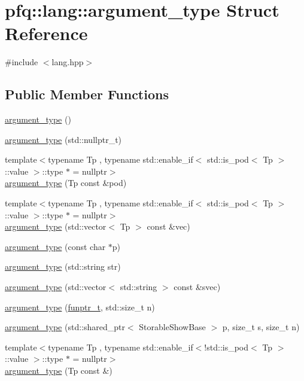 \hypertarget{structpfq_1_1lang_1_1argument__type}{\section{pfq\+:\+:lang\+:\+:argument\+\_\+type Struct Reference}
\label{structpfq_1_1lang_1_1argument__type}
}


{\ttfamily \#include $<$lang.\+hpp$>$}

\subsection*{Public Member Functions}
\begin{DoxyCompactItemize}
\item 
\hyperlink{structpfq_1_1lang_1_1argument__type_aa89bbfb7ed7487d09512e29bc8df723a}{argument\+\_\+type} ()
\item 
\hyperlink{structpfq_1_1lang_1_1argument__type_aaa36abcce4c5e2418fc5a10328619a2d}{argument\+\_\+type} (std\+::nullptr\+\_\+t)
\item 
{\footnotesize template$<$typename Tp , typename std\+::enable\+\_\+if$<$ std\+::is\+\_\+pod$<$ Tp $>$\+::value $>$\+::type $\ast$  = nullptr$>$ }\\\hyperlink{structpfq_1_1lang_1_1argument__type_a1ed803face97c18de5b24a852174f160}{argument\+\_\+type} (Tp const \&pod)
\item 
{\footnotesize template$<$typename Tp , typename std\+::enable\+\_\+if$<$ std\+::is\+\_\+pod$<$ Tp $>$\+::value $>$\+::type $\ast$  = nullptr$>$ }\\\hyperlink{structpfq_1_1lang_1_1argument__type_a214fc2f5dc718677454cde46788cef1d}{argument\+\_\+type} (std\+::vector$<$ Tp $>$ const \&vec)
\item 
\hyperlink{structpfq_1_1lang_1_1argument__type_a775f6b6bf458de21aef78e3b806ead9d}{argument\+\_\+type} (const char $\ast$p)
\item 
\hyperlink{structpfq_1_1lang_1_1argument__type_a568ea3646078a7ab97132cbff3805980}{argument\+\_\+type} (std\+::string str)
\item 
\hyperlink{structpfq_1_1lang_1_1argument__type_a0c92af37601c940e4a0359489a6e752e}{argument\+\_\+type} (std\+::vector$<$ std\+::string $>$ const \&svec)
\item 
\hyperlink{structpfq_1_1lang_1_1argument__type_a25b9c5fc803a86259615dd54e13a19e8}{argument\+\_\+type} (\hyperlink{structpfq_1_1lang_1_1funptr__t}{funptr\+\_\+t}, std\+::size\+\_\+t n)
\item 
\hyperlink{structpfq_1_1lang_1_1argument__type_a3586d8765421e7a9fc01ee5185be7f32}{argument\+\_\+type} (std\+::shared\+\_\+ptr$<$ Storable\+Show\+Base $>$ p, size\+\_\+t s, size\+\_\+t n)
\item 
{\footnotesize template$<$typename Tp , typename std\+::enable\+\_\+if$<$!std\+::is\+\_\+pod$<$ Tp $>$\+::value $>$\+::type $\ast$  = nullptr$>$ }\\\hyperlink{structpfq_1_1lang_1_1argument__type_a4285751f800858bb96057e3ffd44dc77}{argument\+\_\+type} (Tp const \&)
\end{DoxyCompactItemize}
